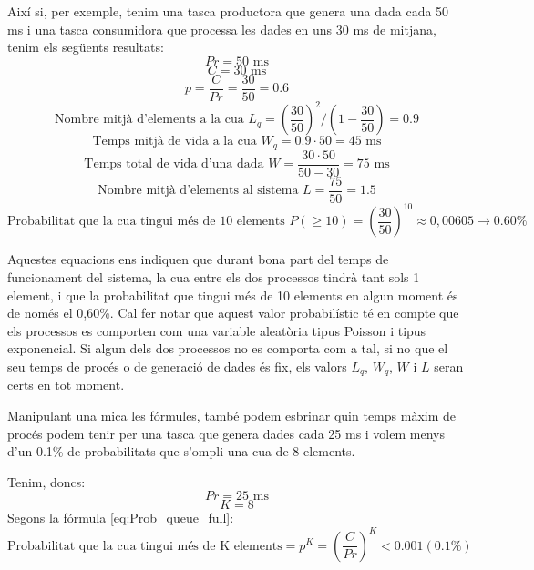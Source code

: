 Així si, per exemple, tenim una tasca productora que genera una dada cada 50 ms i una tasca consumidora que processa les dades en uns 30 ms de mitjana, tenim els següents resultats:
\begin{equation*}
Pr = 50 \text{ ms}
\end{equation*}
\begin{equation*}
C = 30 \text{ ms}
\end{equation*}
\begin{equation*}
p = \frac{C}{Pr} = \frac{30}{50} = 0.6
\end{equation*}
\begin{equation*}
\text{Nombre mitjà d'elements a la cua } L_q = (\frac{30}{50})^2 / (1 - \frac{30}{50})  = 0.9
\end{equation*}
\begin{equation*}
\text{Temps mitjà de vida a la cua } W_q = 0.9 \cdot 50 = 45 \text{ ms}
\end{equation*}
\begin{equation*}
\text{Temps total de vida d'una dada } W =  \frac{30  \cdot 50}{50-30} = 75 \text{ ms}
\end{equation*}
\begin{equation*}
\text{Nombre mitjà d'elements al sistema } L =  \frac{75}{50} = 1.5
\end{equation*}
\begin{equation*}
\text{Probabilitat que la cua tingui més de 10 elements } P(\geqslant 10) =  (\frac{30}{50})^{10} \approx 0,00605 \rightarrow 0.60 \%
\end{equation*}

Aquestes equacions ens indiquen que durant bona part del temps de funcionament del sistema, la cua entre els dos processos tindrà tant sols 1 element, i que la probabilitat que tingui més de 10 elements en algun moment és de només el 0,60\%.
Cal fer notar que aquest valor probabilístic té en compte que els processos es comporten com una variable aleatòria tipus Poisson i tipus exponencial. Si algun dels dos processos no es comporta com a tal, si no que el seu temps de procés o de generació de dades és fix, els valors $L_q$, $W_q$, $W$ i $L$ seran certs en tot moment.

Manipulant una mica les fórmules, també podem esbrinar quin temps màxim de procés podem tenir per una tasca que genera dades cada 25 ms i volem menys d'un 0.1\% de probabilitats que s'ompli una cua de 8 elements.

Tenim, doncs:
\begin{equation*}
 Pr = 25 \text{ ms}
\end{equation*}
\begin{equation*}
 K = 8
\end{equation*}
Segons la fórmula \ref{eq:Prob_queue_full}:
\begin{equation*}
 \text{Probabilitat que la cua tingui més de K elements} = p^K =  (\frac{C}{Pr})^K < 0.001 (0.1\%)
\end{equation*}

